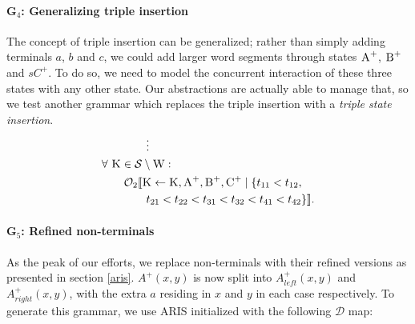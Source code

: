 \documentclass[nonatbib,numbers,10pt]{sigplanconf}
\newcommand\s{\textsc}
\newcommand{\Orderr}[5]{
	\mathcal{#1}_{#5}\llbracket #2 \leftarrow #3 \mid \{ #4 \} \rrbracket.
}
\newcommand{\Or}[4]{\Orderr{O}{#1}{#2}{#3}{#4}}
\begin{document}
\paragraph{G$_4$: Generalizing triple insertion}
The concept of triple insertion can be generalized; rather than simply adding terminals $a$, $b$ and $c$, we could add larger word segments through states $\s{A}^+$, $\s{B}^+$ and $s{C}^+$. To do so, we need to model the concurrent interaction of these three states with any other state. Our abstractions are actually able to manage that, so we test another grammar which replaces the triple insertion with a \textit{triple state insertion}.
\begin{align*}
& \quad\quad\quad\quad \vdots \\
&\forall \ \s{K} \in \mathcal{S} \setminus \s{W}:\\ 
&\quad\quad\Or{\s{K}}{\s{K}, \s{A}^+, \s{B}^+, \s{C}^+}{t_{11} < t_{12},\\
&\quad\quad\quad\quad t_{21} < t_{22} < t_{31} < t_{32} < t_{41} < t_{42}}{2}
\end{align*}
\paragraph{G$_5$: Refined non-terminals}
As the peak of our efforts, we replace non-terminals with their refined versions as presented in section \ref{aris}. $A^{+}(x,y)$ is now split into $A^{+}_{left}(x,y)$ and $A^{+}_{right}(x,y)$, with the extra $a$ residing in $x$ and $y$ in each case respectively. To generate this grammar, we use ARIS initialized with the following $\mathcal{D}$ map:
\end{document}
